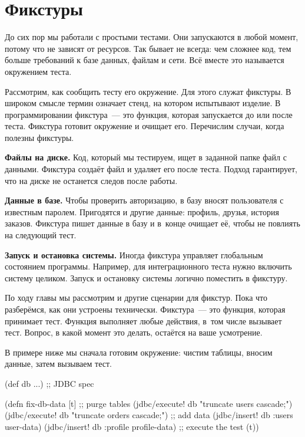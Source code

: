 \fi

\section{Фикстуры}


До сих пор мы работали с простыми тестами. Они запускаются в любой момент,
потому что не зависят от ресурсов. Так бывает не всегда: чем сложнее код, тем
больше требований к базе данных, файлам и сети. Всё вместе это называется
окружением теста.

Рассмотрим, как сообщить тесту его окружение. Для этого служат фикстуры. В
широком смысле термин означает стенд, на котором испытывают изделие. В
программировании фикстура~--- это функция, которая запускается до или после
теста. Фикстура готовит окружение и очищает его. Перечислим случаи, когда
полезны фикстуры.


\textbf{Файлы на диске.} Код, который мы тестируем, ищет в заданной папке файл с
данными. Фикстура создаёт файл и удаляет его после теста. Подход гарантирует,
что на диске не останется следов после работы.

\textbf{Данные в базе.} Чтобы проверить авторизацию, в базу вносят пользователя
с известным паролем. Пригодятся и другие данные: профиль, друзья, история
заказов. Фикстура пишет данные в базу и в~конце очищает её, чтобы не повлиять на
следующий тест.

\textbf{Запуск и остановка системы.} Иногда фикстура управляет глобальным
состоянием программы. Например, для интеграционного теста нужно включить систему
целиком. Запуск и остановку системы логично поместить в фикстуру.

По ходу главы мы рассмотрим и другие сценарии для фикстур. Пока что разберёмся,
как они устроены технически. Фикстура~--- это функция, которая принимает
тест. Функция выполняет любые действия, в~том числе вызывает тест. Вопрос, в
какой момент это делать, остаётся на ваше усмотрение.

В примере ниже мы сначала готовим окружение: чистим таблицы, вносим данные,
затем вызываем тест.


\label{fix-db-data}

\ifnarrow

\begin{english}
  \begin{clojure}
(def db {...}) ;; JDBC spec

(defn fix-db-data [t]
  ;; purge tables
  (jdbc/execute! db
    "truncate users cascade;")
  (jdbc/execute! db
    "truncate orders cascade;")
  ;; add data
  (jdbc/insert! db :users user-data)
  (jdbc/insert! db
    :profile profile-data)
  ;; execute the test
  (t))
  \end{clojure}
\end{english}

